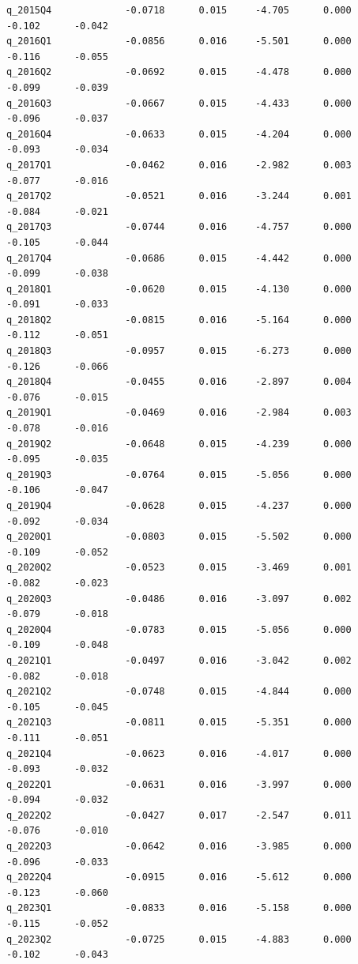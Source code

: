 \documentclass[a4paper,11pt]{article}
\renewcommand{\_}{\textunderscore\allowbreak}
\begin{document}
\begin{verbatim}
q_2015Q4             -0.0718      0.015     -4.705      0.000      -0.102      -0.042
q_2016Q1             -0.0856      0.016     -5.501      0.000      -0.116      -0.055
q_2016Q2             -0.0692      0.015     -4.478      0.000      -0.099      -0.039
q_2016Q3             -0.0667      0.015     -4.433      0.000      -0.096      -0.037
q_2016Q4             -0.0633      0.015     -4.204      0.000      -0.093      -0.034
q_2017Q1             -0.0462      0.016     -2.982      0.003      -0.077      -0.016
q_2017Q2             -0.0521      0.016     -3.244      0.001      -0.084      -0.021
q_2017Q3             -0.0744      0.016     -4.757      0.000      -0.105      -0.044
q_2017Q4             -0.0686      0.015     -4.442      0.000      -0.099      -0.038
q_2018Q1             -0.0620      0.015     -4.130      0.000      -0.091      -0.033
q_2018Q2             -0.0815      0.016     -5.164      0.000      -0.112      -0.051
q_2018Q3             -0.0957      0.015     -6.273      0.000      -0.126      -0.066
q_2018Q4             -0.0455      0.016     -2.897      0.004      -0.076      -0.015
q_2019Q1             -0.0469      0.016     -2.984      0.003      -0.078      -0.016
q_2019Q2             -0.0648      0.015     -4.239      0.000      -0.095      -0.035
q_2019Q3             -0.0764      0.015     -5.056      0.000      -0.106      -0.047
q_2019Q4             -0.0628      0.015     -4.237      0.000      -0.092      -0.034
q_2020Q1             -0.0803      0.015     -5.502      0.000      -0.109      -0.052
q_2020Q2             -0.0523      0.015     -3.469      0.001      -0.082      -0.023
q_2020Q3             -0.0486      0.016     -3.097      0.002      -0.079      -0.018
q_2020Q4             -0.0783      0.015     -5.056      0.000      -0.109      -0.048
q_2021Q1             -0.0497      0.016     -3.042      0.002      -0.082      -0.018
q_2021Q2             -0.0748      0.015     -4.844      0.000      -0.105      -0.045
q_2021Q3             -0.0811      0.015     -5.351      0.000      -0.111      -0.051
q_2021Q4             -0.0623      0.016     -4.017      0.000      -0.093      -0.032
q_2022Q1             -0.0631      0.016     -3.997      0.000      -0.094      -0.032
q_2022Q2             -0.0427      0.017     -2.547      0.011      -0.076      -0.010
q_2022Q3             -0.0642      0.016     -3.985      0.000      -0.096      -0.033
q_2022Q4             -0.0915      0.016     -5.612      0.000      -0.123      -0.060
q_2023Q1             -0.0833      0.016     -5.158      0.000      -0.115      -0.052
q_2023Q2             -0.0725      0.015     -4.883      0.000      -0.102      -0.043

\end{verbatim}
\end{document}
